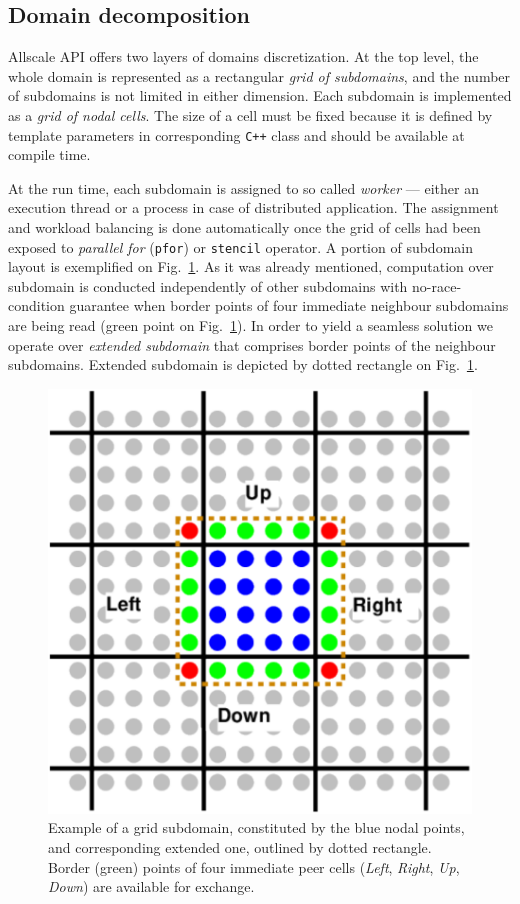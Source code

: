 \documentclass[acmsmall,review,anonymous]{acmart}\settopmatter{printfolios=true,printccs=false,printacmref=false}
\begin{document}
\subsection{Domain decomposition}

Allscale API offers two layers of domains discretization. At the top level, the whole domain is represented as a rectangular \textit{grid of subdomains}, and the number of subdomains is not limited in either dimension. Each subdomain is implemented as a \textit{grid of nodal cells}. The size of a cell must be fixed because it is defined by template parameters in corresponding \texttt{C++} class and should be available at compile time.

At the run time, each subdomain is assigned to so called \textit{worker} --- either an execution thread or a process in case of distributed application. The assignment and workload balancing is done automatically once the grid of cells had been exposed to \textit{parallel for} (\texttt{pfor}) or \texttt{stencil} operator. A portion of subdomain layout is exemplified on Fig.~\ref{fig:cell}. As it was already mentioned, computation over subdomain is conducted independently of other subdomains with no-race-condition guarantee when border points of four immediate neighbour subdomains are being read (green point on Fig.~\ref{fig:cell}). In order to yield a seamless solution we operate over \textit{extended subdomain} that comprises border points of the neighbour subdomains. Extended subdomain is depicted by dotted rectangle on Fig.~\ref{fig:cell}. 

\begin{figure}[!htb]
\includegraphics[scale=0.33]{images/subdomain}
\caption{Example of a grid subdomain, constituted by the blue nodal points, and corresponding extended one, outlined by dotted rectangle. Border (green) points of four immediate peer cells (\textit{Left}, \textit{Right}, \textit{Up}, \textit{Down}) are available for exchange.}
\label{fig:cell}
\end{figure}
\end{document}
